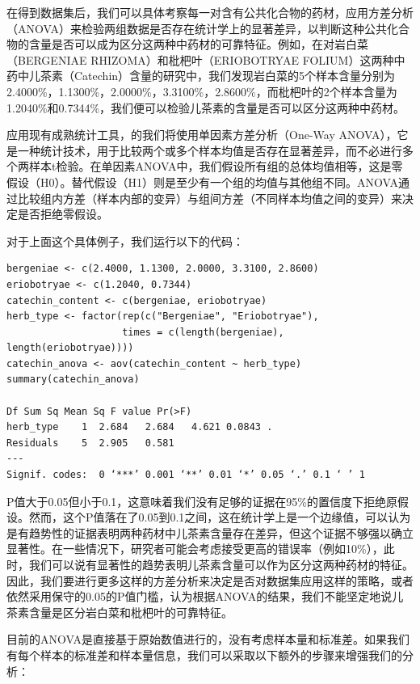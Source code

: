 在得到数据集后，我们可以具体考察每一对含有公共化合物的药材，应用方差分析（ANOVA）来检验两组数据是否存在统计学上的显著差异，以判断这种公共化合物的含量是否可以成为区分这两种中药材的可靠特征。例如，在对岩白菜（BERGENIAE RHIZOMA）和枇杷叶（ERIOBOTRYAE FOLIUM）这两种中药中儿茶素（Catechin）含量的研究中，我们发现岩白菜的5个样本含量分别为2.4000\%，1.1300\%，2.0000\%，3.3100\%，2.8600\%\cite{Pandey_Kumar_Meena_Srivastava_Mishra_Tiwari_Pal_Nair_Upreti_Rana_2017}，而枇杷叶的2个样本含量为1.2040\%和0.7344\%\cite{Chen_Zhang_Chen_2008}，我们便可以检验儿茶素的含量是否可以区分这两种中药材。

应用现有成熟统计工具，的我们将使用单因素方差分析（One-Way ANOVA），它是一种统计技术，用于比较两个或多个样本均值是否存在显著差异，而不必进行多个两样本t检验。在单因素ANOVA中，我们假设所有组的总体均值相等，这是零假设（H0）。替代假设（H1）则是至少有一个组的均值与其他组不同。ANOVA通过比较组内方差（样本内部的变异）与组间方差（不同样本均值之间的变异）来决定是否拒绝零假设。

对于上面这个具体例子，我们运行以下的代码：

\begin{lstlisting}
bergeniae <- c(2.4000, 1.1300, 2.0000, 3.3100, 2.8600)
eriobotryae <- c(1.2040, 0.7344)
catechin_content <- c(bergeniae, eriobotryae)
herb_type <- factor(rep(c("Bergeniae", "Eriobotryae"),
                    times = c(length(bergeniae), length(eriobotryae))))
catechin_anova <- aov(catechin_content ~ herb_type)
summary(catechin_anova)

Df Sum Sq Mean Sq F value Pr(>F)  
herb_type    1  2.684   2.684   4.621 0.0843 .
Residuals    5  2.905   0.581                 
---
Signif. codes:  0 ‘***’ 0.001 ‘**’ 0.01 ‘*’ 0.05 ‘.’ 0.1 ‘ ’ 1
\end{lstlisting}

P值大于0.05但小于0.1，这意味着我们没有足够的证据在95\%的置信度下拒绝原假设。然而，这个P值落在了0.05到0.1之间，这在统计学上是一个边缘值，可以认为是有趋势性的证据表明两种药材中儿茶素含量存在差异，但这个证据不够强以确立显著性。在一些情况下，研究者可能会考虑接受更高的错误率（例如10\%），此时，我们可以说有显著性的趋势表明儿茶素含量可以作为区分这两种药材的特征。因此，我们要进行更多这样的方差分析来决定是否对数据集应用这样的策略，或者依然采用保守的0.05的P值门槛，认为根据ANOVA的结果，我们不能坚定地说儿茶素含量是区分岩白菜和枇杷叶的可靠特征。

目前的ANOVA是直接基于原始数值进行的，没有考虑样本量和标准差。如果我们有每个样本的标准差和样本量信息，我们可以采取以下额外的步骤来增强我们的分析：

